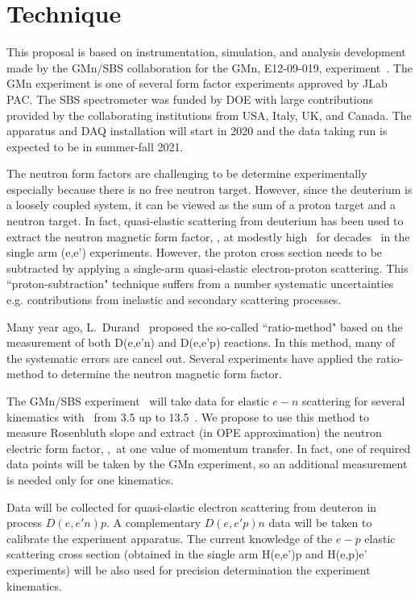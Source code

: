 \section{Technique}
%
This proposal is based on instrumentation, simulation, and analysis development made by the GMn/SBS collaboration for the GMn, E12-09-019, experiment~\cite{E12-09-019}.
The GMn experiment is one of several form factor experiments approved by JLab PAC. 
The SBS spectrometer was funded by DOE with large contributions provided by the collaborating institutions from USA, Italy, UK, and Canada. 
The apparatus and DAQ installation will start in 2020 and the data taking run is expected to be in summer-fall 2021.

The neutron form factors are challenging to be determine experimentally especially because there is no free neutron target. 
However, since the deuterium is a loosely coupled system, it can be viewed as the sum of a proton target and a neutron target. 
In fact, quasi-elastic scattering from deuterium has been used to extract the neutron magnetic form factor, \gmn, at modestly high \qsq~for decades~\cite{Hughes:1965zza, Arnold:1988us} in the single arm (e,e') experiments. 
However, the proton cross section needs to be subtracted by applying a single-arm quasi-elastic electron-proton scattering. 
This ``proton-subtraction" technique suffers from a number systematic uncertainties e.g. contributions from inelastic and secondary scattering processes. 

Many year ago, L.~Durand~\cite{Durand:1959zz} proposed the so-called ``ratio-method" based on the measurement of both D(e,e'n) and D(e,e'p) reactions. 
In this method, many of the systematic errors are cancel out. 
Several experiments \cite{Bruins:1995ns, Kubon:2001rj, Lachniet:2008qf} have applied the ratio-method to determine the neutron magnetic form factor.

The GMn/SBS experiment~\cite{E12-09-019} will take data for elastic $e-n$ scattering for several kinematics with \qsq~from 3.5 up to 13.5~\gevcsq.
We propose to use this method to measure Rosenbluth slope and extract (in OPE approximation) the neutron electric form factor, \gen,~at one value of momentum transfer.
In fact, one of required data points will be taken by the GMn experiment, so an additional measurement is needed only for one
kinematics.

Data will be collected for quasi-elastic electron scattering from deuteron in process $D(e,e'n)p$. 
A complementary $D(e,e'p)n$ data will be taken to calibrate the experiment apparatus.
The current knowledge of the $e-p$ elastic scattering cross section (obtained in the single arm H(e,e')p and H(e,p)e' experiments) will be also used
for precision determination the experiment kinematics.

